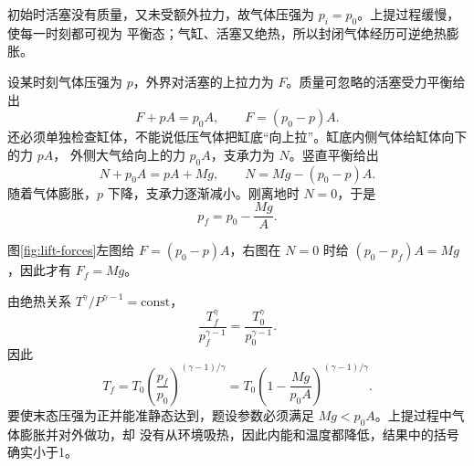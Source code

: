 \begin{xesolution}
初始时活塞没有质量，又未受额外拉力，故气体压强为 $p_i=p_0$。上提过程缓慢，使每一时刻都可视为
平衡态；气缸、活塞又绝热，所以封闭气体经历可逆绝热膨胀。

设某时刻气体压强为 $p$，外界对活塞的上拉力为 $F$。质量可忽略的活塞受力平衡给出
\begin{equation*}
  F+pA=p_0A,
  \qquad
  F=(p_0-p)A.
\end{equation*}
还必须单独检查缸体，不能说低压气体把缸底“向上拉”。缸底内侧气体给缸体向下的力 $pA$，
外侧大气给向上的力 $p_0A$，支承力为 $N$。竖直平衡给出
\[
 N+p_0A=pA+Mg,\qquad N=Mg-(p_0-p)A.
\]
随着气体膨胀，$p$ 下降，支承力逐渐减小。刚离地时 $N=0$，于是
\begin{equation*}
  \boxed{p_f=p_0-\frac{Mg}{A}}.
\end{equation*}

\liftingPistonDiagram
{}\label{fig:lift-forces}
图\ref{fig:lift-forces}左图给 $F=(p_0-p)A$，右图在 $N=0$ 时给 $(p_0-p_f)A=Mg$，因此才有 $F_f=Mg$。

由绝热关系 $T^\gamma/P^{\gamma-1}=\mathrm{const}$，
\begin{equation*}
  \frac{T_f^\gamma}{p_f^{\gamma-1}}
  =\frac{T_0^\gamma}{p_0^{\gamma-1}}.
\end{equation*}
因此
\begin{equation}
  \boxed{T_f=T_0\left(\frac{p_f}{p_0}\right)^{(\gamma-1)/\gamma}
  =T_0\left(1-\frac{Mg}{p_0A}\right)^{(\gamma-1)/\gamma}}.
\end{equation}
要使末态压强为正并能准静态达到，题设参数必须满足 $Mg<p_0A$。上提过程中气体膨胀并对外做功，却
没有从环境吸热，因此内能和温度都降低，结果中的括号确实小于1。
\end{xesolution}
